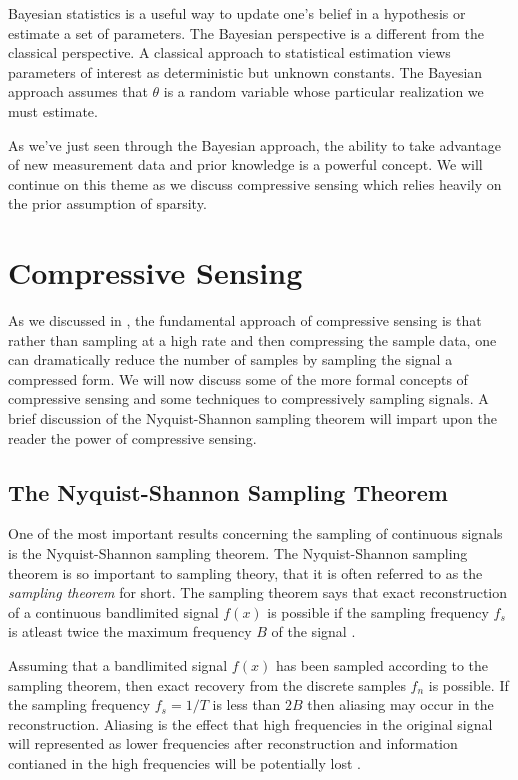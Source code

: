 Bayesian statistics is a useful way to update one's belief in a hypothesis or estimate a set of parameters. The Bayesian perspective is a different from the classical perspective. A classical approach to statistical estimation views parameters of interest as deterministic but unknown constants. The Bayesian approach assumes that $\theta$ is a random variable whose particular realization we must estimate.

As we've just seen through the Bayesian approach, the ability to take advantage of new measurement data and prior knowledge is a powerful concept. We will continue on this theme as we discuss \gls{compressive sensing} which relies heavily on the prior assumption of \gls{sparsity}.

\section{Compressive Sensing}

As we discussed in , the fundamental approach of \gls{compressive sensing} is that rather than sampling  at a high rate and then compressing the sample data, one can dramatically reduce the number of samples by sampling the signal a compressed form. We will now discuss some of the more formal concepts of compressive sensing and some techniques to compressively sampling signals. A brief discussion of the Nyquist-Shannon sampling theorem will impart upon the reader the power of \gls{compressive sensing}.


\subsection{The Nyquist-Shannon Sampling Theorem}

One of the most important results concerning the \gls{sampling} of continuous signals is the Nyquist-Shannon sampling theorem. The Nyquist-Shannon sampling theorem is so important to sampling theory, that it is often referred to as the \emph{sampling theorem} for short. The sampling theorem says that exact reconstruction of a continuous \gls{bandlimited signal} $f(x)$ is possible if the sampling frequency $f_s$ is atleast twice the maximum frequency $ B $ of the signal \cite{shannon1949communication}. 

Assuming that a bandlimited signal $f(x)$ has been sampled according to the sampling theorem, then exact recovery from the discrete samples $f_n$ is possible. If the sampling frequency $f_s = 1/T$ is less than $2B$ then aliasing may occur in the reconstruction. Aliasing is the effect that high frequencies in the original signal will represented as lower frequencies after reconstruction and information contianed in the high frequencies will be potentially lost \cite{proakis1988introduction}. 

